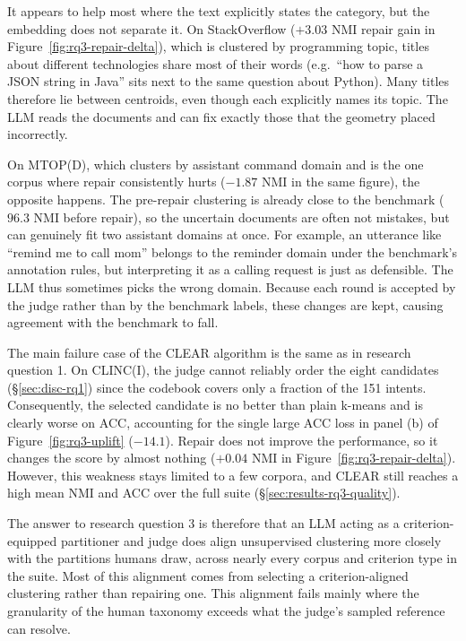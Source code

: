 \documentclass[11pt,a4paper,oneside]{report}
\begin{document}
It appears to help most where the text explicitly states the category, but the
embedding does not separate it. On StackOverflow ($+3.03$ NMI repair
gain in Figure~\ref{fig:rq3-repair-delta}), which is clustered by
programming topic, titles about different technologies share most of
their words (e.g.\ ``how to parse a JSON string in Java'' sits next to the
same question about Python). Many titles therefore lie between
centroids, even though each explicitly names its topic. The LLM reads
the documents and can fix exactly those that the geometry placed
incorrectly.

On MTOP(D), which clusters by assistant command domain and
is the one corpus where repair consistently hurts ($-1.87$ NMI in the
same figure), the opposite happens. The pre-repair clustering is already
close to the benchmark ($96.3$ NMI before repair), so the uncertain documents are often not
mistakes, but can genuinely fit two assistant domains at once. For example,
an utterance like ``remind me to call mom'' belongs to the reminder domain
under the benchmark's annotation rules, but interpreting it as a calling
request is just as defensible. The LLM thus sometimes picks the wrong
domain. Because each round is accepted by the judge rather than by the
benchmark labels, these changes are kept, causing agreement with the
benchmark to fall.

The main failure case of the CLEAR algorithm is the same as in
research question 1. On CLINC(I), the judge cannot reliably order the
eight candidates (\S\ref{sec:disc-rq1}) since the codebook
covers only a fraction of the 151 intents. Consequently, the selected
candidate is no better than plain k-means and is clearly worse on ACC,
accounting for the single large ACC loss in panel (b) of
Figure~\ref{fig:rq3-uplift} ($-14.1$). Repair does not improve the
performance, so it changes the score by
almost nothing ($+0.04$ NMI in Figure~\ref{fig:rq3-repair-delta}). However, this weakness stays limited to a few corpora, and CLEAR
still reaches a high mean NMI and ACC over the
full suite (\S\ref{sec:results-rq3-quality}).


The answer to research question 3 is therefore that an LLM acting as a criterion-equipped partitioner and judge does align unsupervised clustering more closely with the partitions humans draw, across nearly every corpus and criterion type in the suite. Most of this alignment comes from selecting a criterion-aligned clustering rather than repairing one. This alignment fails mainly where the granularity of the human taxonomy exceeds what the judge's sampled reference can resolve.
\end{document}
